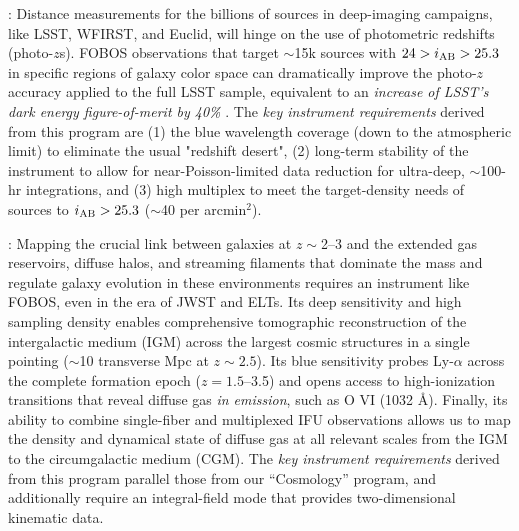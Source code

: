 \documentclass[oneside,11pt]{amsart}
\begin{document}
\smallskip

: Distance measurements for the
billions of sources in deep-imaging campaigns, like LSST, WFIRST, and
Euclid, will hinge on the use of photometric redshifts (photo-$z$s).
FOBOS observations that target $\sim$15k sources with $24 > i_{\rm
AB} > 25.3$ in specific regions of galaxy color space
\citep[see][]{masters15, masters19} can dramatically improve the
photo-$z$ accuracy applied to the full LSST sample, equivalent to an
{\em increase of LSST's dark energy figure-of-merit by 40\%}
\citep{newman15}. The {\it key instrument requirements} derived from
this program are (1) the blue wavelength coverage (down to the
atmospheric limit) to eliminate the usual "redshift desert", (2)
long-term stability of the instrument to allow for
near-Poisson-limited data reduction for ultra-deep, $\sim$100-hr
integrations, and (3) high multiplex to meet the target-density needs
of sources to $i_{\rm AB} > 25.3$ ($\sim$40 per arcmin$^2$).

\smallskip

: Mapping the crucial link between galaxies at $z\sim$2--3 and
the extended gas reservoirs, diffuse halos, and streaming filaments
that dominate the mass and regulate galaxy evolution in these
environments requires an instrument like FOBOS, even in the era of
JWST and ELTs. Its deep sensitivity and high sampling density enables
comprehensive tomographic reconstruction of the intergalactic medium
(IGM) across the largest cosmic structures in a single pointing
($\sim$10 transverse Mpc at $z \sim 2.5$). Its blue sensitivity
probes Ly-$\alpha$ across the complete formation epoch ($z =
1.5$--3.5) and opens access to high-ionization transitions that
reveal diffuse gas \emph{in emission}, such as O VI (1032 \AA).
Finally, its ability to combine single-fiber and multiplexed IFU
observations allows us to map the density and dynamical state of
diffuse gas at all relevant scales from the IGM to the circumgalactic
medium (CGM). The {\it key instrument requirements} derived from this
program parallel those from our ``Cosmology'' program, and
additionally require an integral-field mode that provides
two-dimensional kinematic data.

\smallskip
\end{document}
